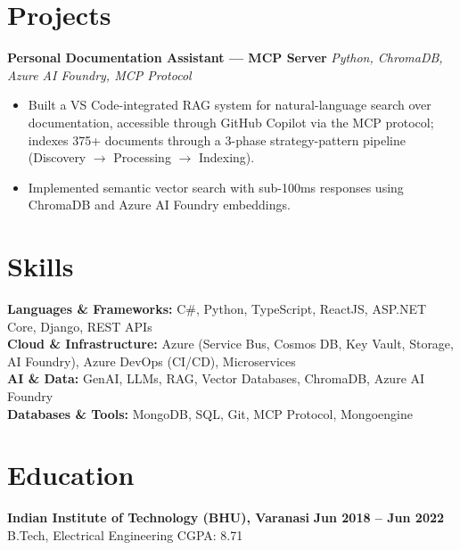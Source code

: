 \documentclass[letterpaper,10pt]{article}
\begin{document}
\section{Projects}

\textbf{Personal Documentation Assistant --- MCP Server} \hfill
\textit{Python, ChromaDB, Azure AI Foundry, MCP Protocol}
\begin{itemize}
  \item Built a VS Code-integrated RAG system for natural-language search over documentation, accessible through GitHub Copilot via the MCP protocol; indexes 375+ documents through a 3-phase strategy-pattern pipeline (Discovery $\rightarrow$ Processing $\rightarrow$ Indexing).
  \item Implemented semantic vector search with sub-100ms responses using ChromaDB and Azure AI Foundry embeddings.
\end{itemize}

\section{Skills}
\textbf{Languages \& Frameworks:} C\#, Python, TypeScript, ReactJS, ASP.NET Core, Django, REST APIs\\[2pt]
\textbf{Cloud \& Infrastructure:} Azure (Service Bus, Cosmos DB, Key Vault, Storage, AI Foundry), Azure DevOps (CI/CD), Microservices\\[2pt]
\textbf{AI \& Data:} GenAI, LLMs, RAG, Vector Databases, ChromaDB, Azure AI Foundry\\[2pt]
\textbf{Databases \& Tools:} MongoDB, SQL, Git, MCP Protocol, Mongoengine

\section{Education}
\textbf{Indian Institute of Technology (BHU), Varanasi} \hfill \textbf{Jun 2018 -- Jun 2022}\\
B.Tech, Electrical Engineering \hfill CGPA: 8.71
\end{document}
